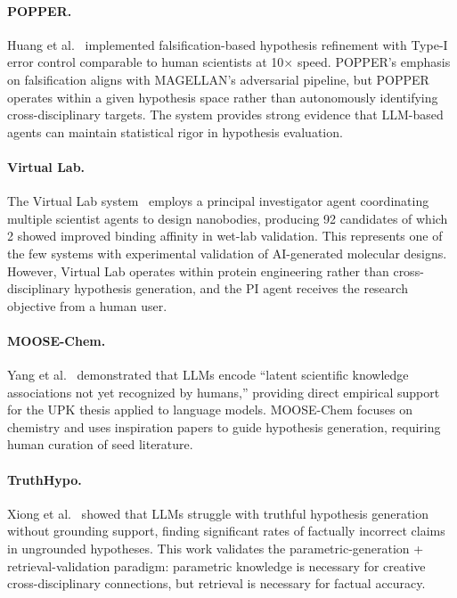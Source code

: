 \paragraph{POPPER.} Huang et al.~\citep{huang2025popper} implemented falsification-based hypothesis refinement with Type-I error control comparable to human scientists at 10$\times$ speed. POPPER's emphasis on falsification aligns with MAGELLAN's adversarial pipeline, but POPPER operates within a given hypothesis space rather than autonomously identifying cross-disciplinary targets. The system provides strong evidence that LLM-based agents can maintain statistical rigor in hypothesis evaluation.

\paragraph{Virtual Lab.} The Virtual Lab system~\citep{swanson2024virtuallab} employs a principal investigator agent coordinating multiple scientist agents to design nanobodies, producing 92 candidates of which 2 showed improved binding affinity in wet-lab validation. This represents one of the few systems with experimental validation of AI-generated molecular designs. However, Virtual Lab operates within protein engineering rather than cross-disciplinary hypothesis generation, and the PI agent receives the research objective from a human user.

\paragraph{MOOSE-Chem.} Yang et al.~\citep{yang2024moosechem} demonstrated that LLMs encode ``latent scientific knowledge associations not yet recognized by humans,'' providing direct empirical support for the UPK thesis applied to language models. MOOSE-Chem focuses on chemistry and uses inspiration papers to guide hypothesis generation, requiring human curation of seed literature.

\paragraph{TruthHypo.} Xiong et al.~\citep{xiong2025} showed that LLMs struggle with truthful hypothesis generation without grounding support, finding significant rates of factually incorrect claims in ungrounded hypotheses. This work validates the parametric-generation + retrieval-validation paradigm: parametric knowledge is necessary for creative cross-disciplinary connections, but retrieval is necessary for factual accuracy.

